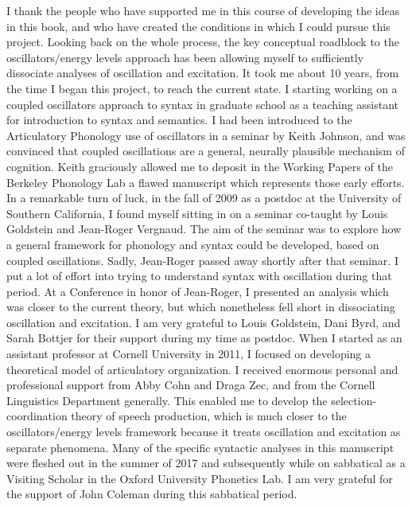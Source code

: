 \addchap{\lsAcknowledgementTitle} 

 

I thank the people who have supported me in this course of developing the ideas in this book, and who have created the conditions in which I could pursue this project. Looking back on the whole process, the key conceptual roadblock to the oscillators/energy levels approach has been allowing myself to sufficiently dissociate analyses of oscillation and excitation. It took me about 10 years, from the time I began this project, to reach the current state. I starting working on a coupled oscillators approach to syntax in graduate school as a teaching assistant for introduction to syntax and semantics. I had been introduced to the Articulatory Phonology use of oscillators in a seminar by Keith Johnson, and was convinced that coupled oscillations are a general, neurally plausible mechanism of cognition. Keith graciously allowed me to deposit in the Working Papers of the Berkeley Phonology Lab a flawed manuscript which represents those early efforts. In a remarkable turn of luck, in the fall of 2009 as a postdoc at the University of Southern California, I found myself sitting in on a seminar co-taught by Louis Goldstein and Jean-Roger Vergnaud. The aim of the seminar was to explore how a general framework for phonology and syntax could be developed, based on coupled oscillations. Sadly, Jean-Roger passed away shortly after that seminar. I put a lot of effort into trying to understand syntax with oscillation during that period. At a Conference in honor of Jean-Roger, I presented an analysis which was closer to the current theory, but which nonetheless fell short in dissociating oscillation and excitation. I am very grateful to Louis Goldstein, Dani Byrd, and Sarah Bottjer for their support during my time as postdoc. When I started as an assistant professor at Cornell University in 2011, I focused on developing a theoretical model of articulatory organization. I received enormous personal and professional support from Abby Cohn and Draga Zec, and from the Cornell Linguistics Department generally. This enabled me to develop the selection-coordination theory of speech production, which is much closer to the oscillators/energy levels framework because it treats oscillation and excitation as separate phenomena. Many of the specific syntactic analyses in this manuscript were fleshed out in the summer of 2017 and subsequently while on sabbatical as a Visiting Scholar in the Oxford University Phonetics Lab. I am very grateful for the support of John Coleman during this sabbatical period.

